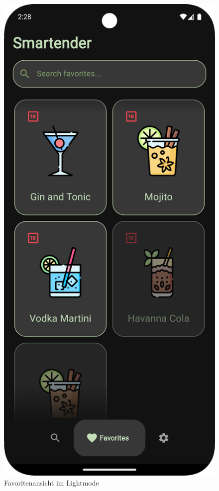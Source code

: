 \begin{figure}[H]
\begin{minipage}{0.27\textwidth}
        \caption{Favoritenansicht im Lightmode}
        \label{fig:favorites_light}
    \end{minipage}
    \hfill
    \begin{minipage}{0.27\textwidth}
        \centering
        \includegraphics[width=\textwidth]{graphics/images/favorites_dark.png}

\end{minipage}
\end{figure}
